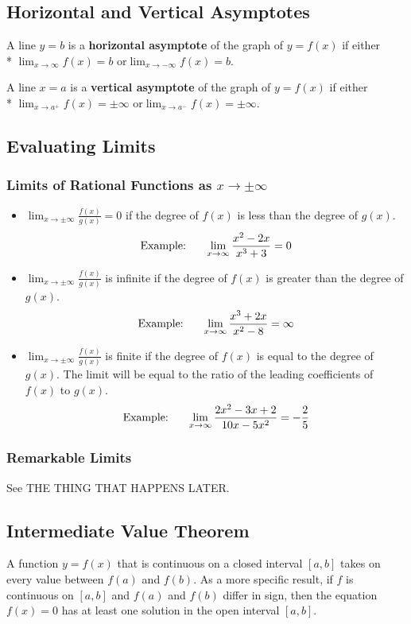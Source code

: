 \documentclass{artikel3}
\begin{document}
\subsection{Horizontal and Vertical Asymptotes}
A line $y=b$ is a \textbf{horizontal asymptote} of the graph of $y=f(x)$ if either\\*
$\displaystyle\lim_{x \to \infty}f(x)=b \text{ or} \lim_{x \to -\infty}f(x)=b$.

A line $x=a$ is a \textbf{vertical asymptote} of the graph of $y=f(x)$ if either\\*
$\displaystyle\lim_{x \to a^+}f(x)=\pm\infty \text{ or} \lim_{x \to a^-}f(x)=\pm\infty$.

\subsection{Evaluating Limits}

\subsubsection{Limits of Rational Functions as $x \to \pm\infty$}
\begin{itemize}
\item{$\displaystyle\lim_{x \to \pm\infty}\frac{f(x)}{g(x)}=0$ if the degree
of $f(x)$ is less than the degree of $g(x)$.
\[ \text{Example:}\hspace{6 mm}\lim_{x \to \infty}\frac{x^2-2x}{x^3+3}=0 \]}
\item{$\displaystyle\lim_{x \to \pm\infty}\frac{f(x)}{g(x)}$ is infinite if the degree
of $f(x)$ is greater than the degree of $g(x)$.
\[ \text{Example:}\hspace{6 mm}\lim_{x \to \infty}\frac{x^3+2x}{x^2-8}=\infty \]}
\item{$\displaystyle\lim_{x \to \pm\infty}\frac{f(x)}{g(x)}$ is finite if the degree 
of $f(x)$ is equal to the degree of $g(x)$. The limit will be equal to the ratio of 
the leading coefficients of $f(x)$ to $g(x)$.
\[ \text{Example:}\hspace{6 mm}\lim_{x \to \infty}\frac{2x^2-3x+2}{10x-5x^2}=-\frac{2}{5} \]}
\end{itemize}

\subsubsection{Remarkable Limits}
See THE THING THAT HAPPENS LATER.

\subsection{Intermediate Value Theorem}
A function $y=f(x)$ that is continuous on a closed interval $[a,b]$ takes on 
every value between $f(a)$ and $f(b)$.
As a more specific result, if $f$ is continuous on $[a,b]$ and $f(a)$ and $f(b)$ 
differ in sign, then the equation $f(x)=0$ has at least one solution 
in the open interval $[a,b]$.
\end{document}
